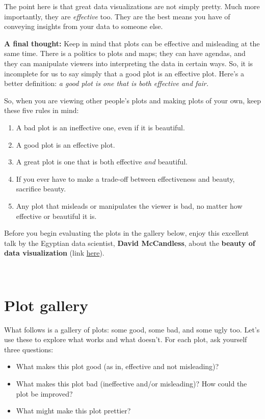 \documentclass[]{book}
\begin{document}
The point here is that great data visualizations are not simply pretty. Much more importantly, they are \emph{effective} too. They are the best means you have of conveying insights from your data to someone else.

\textbf{A final thought:} Keep in mind that plots can be effective and misleading at the same time. There is a politics to plots and maps; they can have agendas, and they can manipulate viewers into interpreting the data in certain ways. So, it is incomplete for us to say simply that a good plot is an effective plot. Here's a better definition: \emph{a good plot is one that is both effective and fair.}

So, when you are viewing other people's plots and making plots of your own, keep these five rules in mind:

\begin{enumerate}
\def\labelenumi{\arabic{enumi}.}
\item
  A bad plot is an ineffective one, even if it is beautiful.
\item
  A good plot is an effective plot.
\item
  A great plot is one that is both effective \emph{and} beautiful.
\item
  If you ever have to make a trade-off between effectiveness and beauty, sacrifice beauty.
\item
  Any plot that misleads or manipulates the viewer is bad, no matter how effective or beautiful it is.
\end{enumerate}

Before you begin evaluating the plots in the gallery below, enjoy this excellent talk by the Egyptian data scientist, \textbf{David McCandless}, about the \textbf{beauty of data visualization} (link \href{https://www.youtube.com/watch?v=5Zg-C8AAIGg}{here}).

~

\hypertarget{plot-gallery}{%
\section*{Plot gallery}\label{plot-gallery}}

What follows is a gallery of plots: some good, some bad, and some ugly too. Let's use these to explore what works and what doesn't. For each plot, ask yourself three questions:

\begin{itemize}
\item
  What makes this plot good (as in, effective and not misleading)?
\item
  What makes this plot bad (ineffective and/or misleading)? How could the plot be improved?
\item
  What might make this plot prettier?
\end{itemize}
\end{document}
